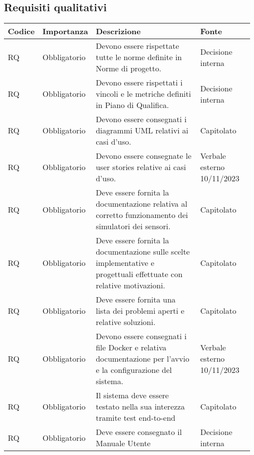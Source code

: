 \subsection{Requisiti qualitativi}
\setcounter{rowcounter}{0}
\begin{longtable}{|C{1cm}|C{2cm}|>{\raggedright}m{5cm}|C{2cm}|}
    \hline
    \textbf{Codice} & \textbf{Importanza} & \textbf{Descrizione} & \textbf{Fonte} \\
    \hline
    RQ & Obbligatorio &  Devono essere rispettate tutte le norme definite in Norme di progetto.  & Decisione interna \\
    \hline
     RQ & Obbligatorio &  Devono essere rispettati i vincoli e le metriche definiti in Piano di Qualifica.  & Decisione interna \\
    \hline
     RQ & Obbligatorio &  Devono essere consegnati i diagrammi UML relativi ai casi d'uso.  & Capitolato \\
    \hline
     RQ & Obbligatorio &  Devono essere consegnate le user stories relative ai casi d'uso.  & Verbale esterno 10/11/2023 \\
    \hline
     RQ & Obbligatorio &  Deve essere fornita la documentazione relativa al corretto funzionamento dei simulatori dei sensori.  & Capitolato \\
    \hline
     RQ & Obbligatorio & Deve essere fornita la documentazione sulle scelte implementative e progettuali effettuate con relative motivazioni.  & Capitolato \\
    \hline
     RQ & Obbligatorio &  Deve essere fornita una lista dei problemi aperti e relative soluzioni. & Capitolato \\
    \hline
     RQ & Obbligatorio &  Devono essere consegnati i file Docker e relativa documentazione per l'avvio e la configurazione del sistema. & Verbale esterno 10/11/2023 \\
    \hline
     RQ & Obbligatorio &  Il sistema deve essere testato nella sua interezza tramite test end-to-end  & Capitolato \\
    \hline
     RQ & Obbligatorio &  Deve essere consegnato il Manuale Utente & Decisione interna \\

\end{longtable}
